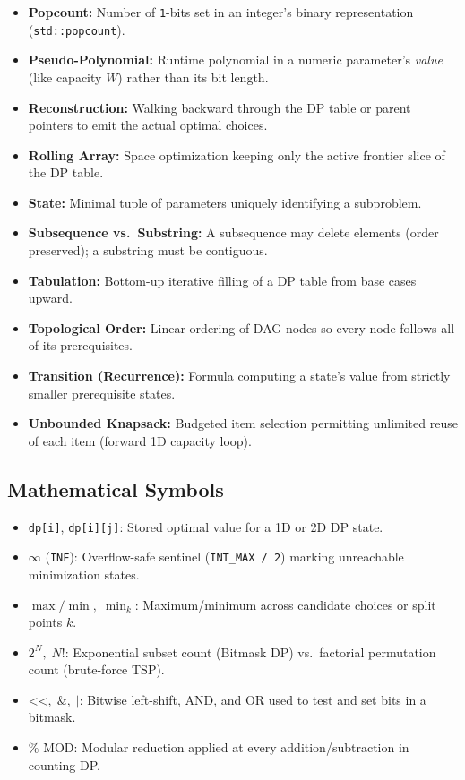 \documentclass[11pt,a4paper]{article}
\theoremstyle{definition}
\begin{document}
\begin{itemize}
    \item \textbf{Popcount:} Number of \texttt{1}-bits set in an integer's binary representation (\texttt{std::popcount}).
    \item \textbf{Pseudo-Polynomial:} Runtime polynomial in a numeric parameter's \emph{value} (like capacity $W$) rather than its bit length.
    \item \textbf{Reconstruction:} Walking backward through the DP table or parent pointers to emit the actual optimal choices.
    \item \textbf{Rolling Array:} Space optimization keeping only the active frontier slice of the DP table.
    \item \textbf{State:} Minimal tuple of parameters uniquely identifying a subproblem.
    \item \textbf{Subsequence vs.\ Substring:} A subsequence may delete elements (order preserved); a substring must be contiguous.
    \item \textbf{Tabulation:} Bottom-up iterative filling of a DP table from base cases upward.
    \item \textbf{Topological Order:} Linear ordering of DAG nodes so every node follows all of its prerequisites.
    \item \textbf{Transition (Recurrence):} Formula computing a state's value from strictly smaller prerequisite states.
    \item \textbf{Unbounded Knapsack:} Budgeted item selection permitting unlimited reuse of each item (forward 1D capacity loop).
\end{itemize}

\subsection*{Mathematical Symbols}
\begin{itemize}
    \item \texttt{dp[i]}, \texttt{dp[i][j]}: Stored optimal value for a 1D or 2D DP state.
    \item $\infty$ (\texttt{INF}): Overflow-safe sentinel (\texttt{INT\_MAX / 2}) marking unreachable minimization states.
    \item $\max / \min,\; \min_k$: Maximum/minimum across candidate choices or split points $k$.
    \item $2^N,\; N!$: Exponential subset count (Bitmask DP) vs.\ factorial permutation count (brute-force TSP).
    \item $\texttt{<<},\; \texttt{\&},\; \texttt{|}$: Bitwise left-shift, AND, and OR used to test and set bits in a bitmask.
    \item $\% \text{ MOD}$: Modular reduction applied at every addition/subtraction in counting DP.
\end{itemize}
\end{document}
